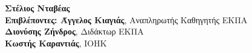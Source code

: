 \begin{center}
    \textbf{\large Στέλιος Νταβέας} \\
    \vspace{2.5cm}
    \textbf{\large Επιβλέποντες: Άγγελος Κιαγιάς}\large , Αναπληρωτής Καθηγητής ΕΚΠΑ\\
    \hspace{0.82cm}
    \textbf{\large Διονύσης Ζήνδρος}\large, Διδάκτωρ ΕΚΠΑ\\
    \hspace{-1.15cm}
    \textbf{\large Κωστής Καραντιάς}\large, IOHK

    \vspace{2.0cm}

    \date{\textbf{Αθήνα}, \\ \textbf{Ιούνιος 2020}}
    \pagebreak
\end{center}
